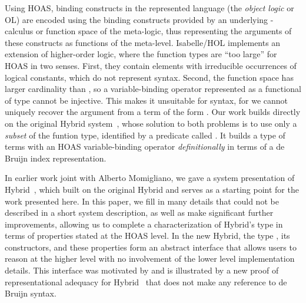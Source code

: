 \documentclass[copyright,creativecommons]{eptcs}
\begin{document}
Using HOAS, binding constructs in the represented language (the
\emph{object logic} or OL) are encoded using the binding constructs
provided by an underlying -calculus or function space of the
meta-logic, thus representing the arguments of these constructs as
functions of the meta-level.  Isabelle/HOL implements an extension of
higher-order logic, where the function types are ``too large'' for
HOAS in two senses.  First, they contain elements with irreducible
occurrences of logical constants, which do not represent syntax.
Second, the function space  has larger
cardinality than , so a variable-binding operator represented as
a functional  of type 
cannot be injective.  This makes it unsuitable for syntax, for we
cannot uniquely recover the argument  from a term of the form
.  Our work builds directly on the original Hybrid
system~\cite{ambler/crole/momigliano:2002}, whose solution to both
problems is to use only a \emph{subset} of the funtion type,
identified by a predicate called .  It builds a type
 of terms with an HOAS variable-binding operator
\emph{definitionally} in terms of a de Bruijn index representation.

In earlier work joint with Alberto Momigliano, we gave a system
presentation of Hybrid~\cite{momigliano/martin/felty:2008}, which
built on the original Hybrid and serves as a starting point for the
work presented here.  In this paper, we fill in many details that
could not be described in a short system description, as well as make
significant further improvements, allowing us to complete a
characterization of Hybrid's type  in terms of properties
stated at the HOAS level.  In the new Hybrid, the type , its
constructors, and these properties form an abstract interface that
allows users to reason at the higher level with no involvement of the
lower level implementation details.  This interface was motivated by
and is illustrated by a new proof of representational adequacy for
Hybrid~\cite[Sect.~3.4]{martin:2010a} that does not make any reference
to de Bruijn syntax.
\end{document}
